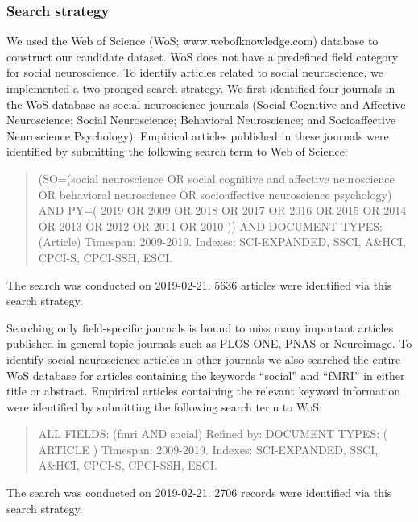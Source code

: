 \documentclass[
  english,
  man,floatsintext]{apa6}
\begin{document}
\hfill\break

\hypertarget{search-strategy}{%
\subsubsection{Search strategy}\label{search-strategy}}

We used the Web of Science (WoS; www.webofknowledge.com) database to construct our candidate dataset. WoS does not have a predefined field category for social neuroscience. To identify articles related to social neuroscience, we implemented a two-pronged search strategy. We first identified four journals in the WoS database as social neuroscience journals (Social Cognitive and Affective Neuroscience; Social Neuroscience; Behavioral Neuroscience; and Socioaffective Neuroscience Psychology). Empirical articles published in these journals were identified by submitting the following search term to Web of Science:

\begin{quote}
(SO=(social neuroscience OR social cognitive and affective neuroscience OR behavioral neuroscience OR socioaffective neuroscience psychology) AND PY=( 2019 OR 2009 OR 2018 OR 2017 OR 2016 OR 2015 OR 2014 OR 2013 OR 2012 OR 2011 OR 2010 )) AND DOCUMENT TYPES: (Article)
Timespan: 2009-2019. Indexes: SCI-EXPANDED, SSCI, A\&HCI, CPCI-S, CPCI-SSH, ESCI.
\end{quote}

The search was conducted on 2019-02-21. 5636 articles were identified via this search strategy.

Searching only field-specific journals is bound to miss many important articles published in general topic journals such as PLOS ONE, PNAS or Neuroimage. To identify social neuroscience articles in other journals we also searched the entire WoS database for articles containing the keywords ``social'' and ``fMRI'' in either title or abstract. Empirical articles containing the relevant keyword information were identified by submitting the following search term to WoS:

\begin{quote}
ALL FIELDS: (fmri AND social)
Refined by: DOCUMENT TYPES: ( ARTICLE )
Timespan: 2009-2019. Indexes: SCI-EXPANDED, SSCI, A\&HCI, CPCI-S, CPCI-SSH, ESCI.
\end{quote}

The search was conducted on 2019-02-21. 2706 records were identified via this search strategy.

\hfill\break
\end{document}
